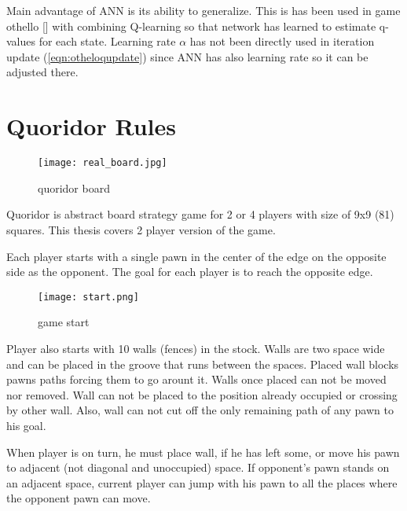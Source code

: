 Main advantage of ANN is its ability to generalize. This is has been used
in game othello [\cite{othello}] with combining Q-learning so that network
has learned to estimate q-values for each state. Learning rate $\alpha$ has
not been directly used in iteration update (\ref{eqn:otheloqupdate}) since
ANN has also learning rate so it can be adjusted there.

\section{Quoridor Rules}
\begin{wrapfigure}{R}{0.4\textwidth}
  \vspace*{-2.80cm}
  \centering
  \texttt{[image: real\_board.jpg]}
  \vspace*{-0.60cm}
  \caption{quoridor board}
  \label{fig:quoridor_board}
  \vspace*{-1.00cm}
\end{wrapfigure}

Quoridor is abstract board strategy game for 2 or 4 players with size of
9x9 (81) squares. This thesis covers 2 player version of the game.

Each player starts with a single pawn in the center of the edge on the
opposite side as the opponent.
The goal for each player is to reach the opposite edge.

\begin{wrapfigure}{L}{0.35\textwidth}
  \vspace*{-0.20cm}
  \centering
  \texttt{[image: start.png]}
  \vspace*{-1.20cm}
  \caption{game start}
  \label{fig:game_start}
  \vspace*{-0.40cm}
\end{wrapfigure}

Player also starts with 10 walls (fences) in the stock.
Walls are two space wide and can be placed in the groove that runs between
the spaces.
Placed wall blocks pawns paths forcing them to go arount it.
Walls once placed can not be moved nor removed.
Wall can not be placed to the position already occupied or crossing by
other wall.
Also, wall can not cut off the only remaining path of any pawn to his goal.

When player is on turn, he must place wall, if he has left some, or move
his pawn to adjacent (not diagonal and unoccupied) space.
If opponent's pawn stands on an adjacent space, current player can jump
with his pawn to all the places where the opponent pawn can move.

